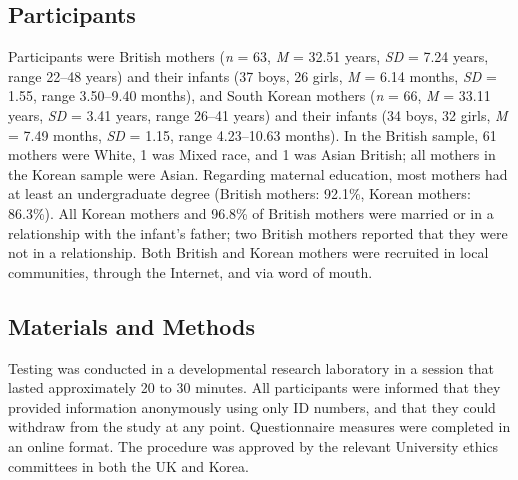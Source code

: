 \documentclass[
]{article}
\begin{document}
\hypertarget{participants}{%
\subsection*{Participants}\label{participants}}

Participants were British mothers (\emph{n} = 63, \emph{M} = 32.51 years, \emph{SD} = 7.24 years, range 22--48 years) and their infants (37 boys, 26 girls, \emph{M} = 6.14 months, \emph{SD} = 1.55, range 3.50--9.40 months), and South Korean mothers (\emph{n} = 66, \emph{M} = 33.11 years, \emph{SD} = 3.41 years, range 26--41 years) and their infants (34 boys, 32 girls, \emph{M} = 7.49 months, \emph{SD} = 1.15, range 4.23--10.63 months). In the British sample, 61 mothers were White, 1 was Mixed race, and 1 was Asian British; all mothers in the Korean sample were Asian. Regarding maternal education, most mothers had at least an undergraduate degree (British mothers: 92.1\%, Korean mothers: 86.3\%). All Korean mothers and 96.8\% of British mothers were married or in a relationship with the infant's father; two British mothers reported that they were not in a relationship. Both British and Korean mothers were recruited in local communities, through the Internet, and via word of mouth.

\hypertarget{materials-and-methods}{%
\subsection*{Materials and Methods}\label{materials-and-methods}}

Testing was conducted in a developmental research laboratory in a session that lasted approximately 20 to 30 minutes. All participants were informed that they provided information anonymously using only ID numbers, and that they could withdraw from the study at any point. Questionnaire measures were completed in an online format. The procedure was approved by the relevant University ethics committees in both the UK and Korea.
\end{document}
